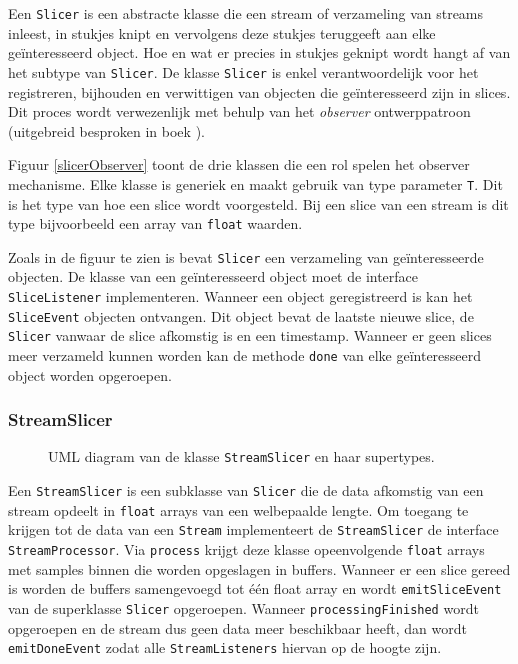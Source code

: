 Een \texttt{Slicer} is een abstracte klasse die een stream of verzameling van streams inleest, in stukjes knipt en vervolgens deze stukjes teruggeeft aan elke geïnteresseerd object. Hoe en wat er precies in stukjes geknipt wordt hangt af van het subtype van \texttt{Slicer}. De klasse \texttt{Slicer} is enkel verantwoordelijk voor het registreren, bijhouden en verwittigen van objecten die geïnteresseerd zijn in slices. Dit proces wordt verwezenlijk met behulp van het \textit{observer} ontwerppatroon (uitgebreid besproken in boek \cite{vlissides1995design}). 

Figuur \ref{slicerObserver} toont de drie klassen die een rol spelen het observer mechanisme. Elke klasse is generiek en maakt gebruik van type parameter \texttt{T}. Dit is het type van hoe een slice wordt voorgesteld. Bij een slice van een stream is dit type bijvoorbeeld een array van \texttt{float} waarden.

Zoals in de figuur te zien is bevat \texttt{Slicer} een verzameling van geïnteresseerde objecten. De klasse van een geïnteresseerd object moet de interface \texttt{SliceListener} implementeren. Wanneer een object geregistreerd is kan het \texttt{SliceEvent} objecten ontvangen. Dit object bevat de laatste nieuwe slice, de \texttt{Slicer} vanwaar de slice afkomstig is en een timestamp. Wanneer er geen slices meer verzameld kunnen worden kan de methode \texttt{done} van elke geïnteresseerd object worden opgeroepen.

\subsubsection{StreamSlicer}

\begin{figure}[h!]
	\captionsetup{width=0.7\textwidth}
	\caption{UML diagram van de klasse \texttt{StreamSlicer} en haar supertypes.}
	\begin{center}
		\advance\parskip0.3cm
		
	\end{center}
	\label{streamSlicer}
\end{figure}

Een \texttt{StreamSlicer} is een subklasse van \texttt{Slicer} die de data afkomstig van een stream opdeelt in \texttt{float} arrays van een welbepaalde lengte. Om toegang te krijgen tot de data van een \texttt{Stream} implementeert de \texttt{StreamSlicer} de interface \texttt{StreamProcessor}. Via \texttt{process} krijgt deze klasse opeenvolgende \texttt{float} arrays met samples binnen die worden opgeslagen in buffers. Wanneer er een slice gereed is worden de buffers samengevoegd tot één float array en wordt \texttt{emitSliceEvent} van de superklasse \texttt{Slicer} opgeroepen. Wanneer \texttt{processingFinished} wordt opgeroepen en de stream dus geen data meer beschikbaar heeft, dan wordt \texttt{emitDoneEvent} zodat alle \texttt{StreamListeners} hiervan op de hoogte zijn.

